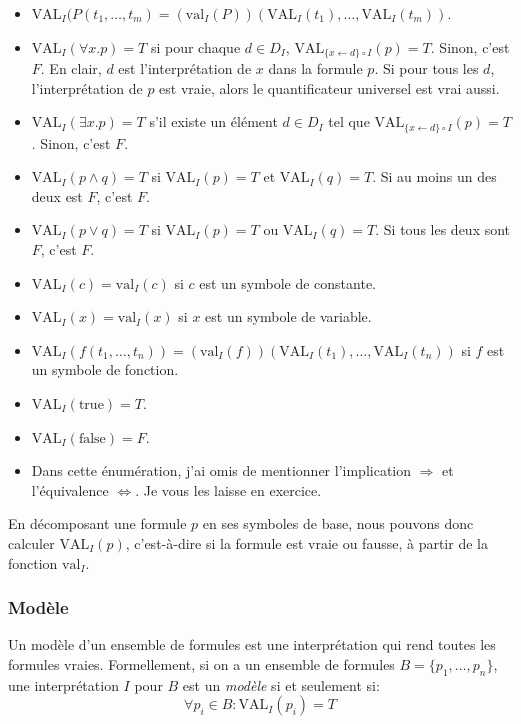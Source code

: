\begin{itemize}
\item $\mathrm{VAL}_I ( P(t_1, \ldots, t_m) = (\mathrm{val}_I(P)) (\mathrm{VAL}_I(t_1), \ldots, \mathrm{VAL}_I(t_m))$.
\item $\mathrm{VAL}_I ( \forall x.p ) = T$ si pour chaque $d \in D_I$, $\mathrm{VAL}_{\{x \leftarrow d\} \circ I}(p) = T$.  Sinon, c'est $F$.
En clair, $d$ est l'interprétation de $x$ dans la formule $p$.  Si pour tous les $d$, l'interprétation de $p$ est vraie, alors le
quantificateur universel est vrai aussi.
\item $\mathrm{VAL}_I ( \exists x.p ) = T$ s'il existe un élément $d \in D_I$ tel que $\mathrm{VAL}_{\{x \leftarrow d\} \circ I}(p) = T$.
Sinon, c'est $F$.
\item $\mathrm{VAL}_I(p \wedge q) = T$ si $\mathrm{VAL}_I(p)=T$ et $\mathrm{VAL}_I(q)=T$.  Si au moins un des deux est $F$, c'est $F$.
\item $\mathrm{VAL}_I(p \vee q) = T$ si $\mathrm{VAL}_I(p)=T$ ou $\mathrm{VAL}_I(q)=T$.  Si tous les deux sont $F$, c'est $F$.
\item $\mathrm{VAL}_I(c) = \mathrm{val}_I(c)$ si $c$ est un symbole de constante.
\item $\mathrm{VAL}_I(x) = \mathrm{val}_I(x)$ si $x$ est un symbole de variable.
\item $\mathrm{VAL}_I(f(t_1, \ldots, t_n)) = (\mathrm{val}_I(f))(\mathrm{VAL}_I(t_1), \ldots, \mathrm{VAL}_I(t_n))$ si $f$ est un symbole de fonction.
\item $\mathrm{VAL}_I(\mathrm{true}) = T$.
\item $\mathrm{VAL}_I(\mathrm{false}) = F$.
\item Dans cette énumération, j'ai omis de mentionner l'implication $\Rightarrow$ et l'équivalence $\Leftrightarrow$.
Je vous les laisse en exercice.
\end{itemize}
En décomposant une formule $p$ en ses symboles de base, nous pouvons donc calculer $\mathrm{VAL}_I(p)$, c'est-à-dire si la formule
est vraie ou fausse, à partir de la fonction $\mathrm{val}_I$.

\subsubsection{Modèle}

Un modèle d'un ensemble de formules est une interprétation qui rend toutes les formules vraies.
Formellement, si on a un ensemble de formules $B = \{ p_1, \ldots, p_n \}$,
une interprétation $I$ pour $B$ est un {\em modèle} si et seulement si:
\begin{equation}
\forall p_i \in B: \mathrm{VAL}_I(p_i) = T
\end{equation}

